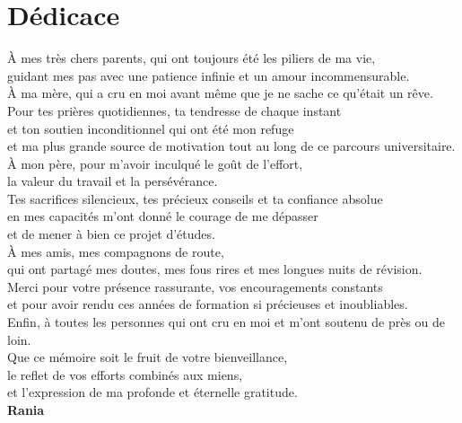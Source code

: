 \chapter*{Dédicace}

\vspace*{2cm}
\begin{flushright}
\itshape

À mes très chers parents, qui ont toujours été les piliers de ma vie,\\
guidant mes pas avec une patience infinie et un amour incommensurable.\\[1.5em]

À ma mère, qui a cru en moi avant même que je ne sache ce qu'était un rêve.\\
Pour tes prières quotidiennes, ta tendresse de chaque instant\\
et ton soutien inconditionnel qui ont été mon refuge\\
et ma plus grande source de motivation tout au long de ce parcours universitaire.\\[1.5em]

À mon père, pour m'avoir inculqué le goût de l'effort,\\
la valeur du travail et la persévérance.\\
Tes sacrifices silencieux, tes précieux conseils et ta confiance absolue\\
en mes capacités m'ont donné le courage de me dépasser\\
et de mener à bien ce projet d'études.\\[1.5em]

À mes amis, mes compagnons de route,\\
qui ont partagé mes doutes, mes fous rires et mes longues nuits de révision.\\
Merci pour votre présence rassurante, vos encouragements constants\\
et pour avoir rendu ces années de formation si précieuses et inoubliables.\\[1.5em]

Enfin, à toutes les personnes qui ont cru en moi et m'ont soutenu de près ou de loin.\\
Que ce mémoire soit le fruit de votre bienveillance,\\
le reflet de vos efforts combinés aux miens,\\
et l'expression de ma profonde et éternelle gratitude.\\[2em]

\normalfont\textbf{Rania}
\end{flushright}
